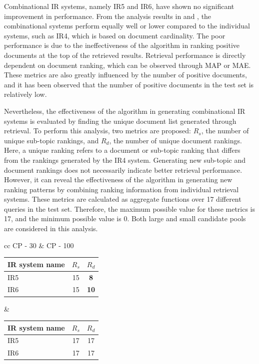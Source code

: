 Combinational IR systems, namely IR5 and IR6, have shown no significant improvement in performance. From the analysis results in  and , the combinational systems perform equally well or lower compared to the individual systems, such as IR4, which is based on document cardinality. The poor performance is due to the ineffectiveness of the algorithm in ranking positive documents at the top of the retrieved results. Retrieval performance is directly dependent on document ranking, which can be observed through MAP or MAE. These metrics are also greatly influenced by the number of positive documents, and it has been observed that the number of positive documents in the test set is relatively low.

Nevertheless, the effectiveness of the algorithm in generating combinational IR systems is evaluated by finding the unique document list generated through retrieval. To perform this analysis, two metrics are proposed: $R_s$, the number of unique sub-topic rankings, and $R_d$, the number of unique document rankings. Here, a unique ranking refers to a document or sub-topic ranking that differs from the rankings generated by the IR4 system. Generating new sub-topic and document rankings does not necessarily indicate better retrieval performance. However, it can reveal the effectiveness of the algorithm in generating new ranking patterns by combining ranking information from individual retrieval systems. These metrics are calculated as aggregate functions over 17 different queries in the test set. Therefore, the maximum possible value for these metrics is 17, and the minimum possible value is 0. Both large and small candidate pools are considered in this analysis.

\begin{center}
	\label{tab:unique_ranking_counts}
	\begin{tabular}{ cc }   %
		CP - 30 & CP - 100 \\  
		\begin{tabularx}{.35\textwidth}{|Y|c|c|}
			\hline
			IR system name & $R_s$ & $R_d$ \\
			\hline
			IR5 & 15 & \textbf{8} \\
			\hline
			IR6 & 15 & \textbf{10} \\
			\hline
			
		\end{tabularx} &  %
		\begin{tabularx}{.35\textwidth}{|Y|c|c|}
	\hline
	IR system name & $R_s$ & $R_d$ \\
	\hline
	IR5 & 17 & 17 \\
	\hline
	IR6 & 17 & 17 \\
	\hline
			
		\end{tabularx} \\
	\end{tabular}
\end{center}

